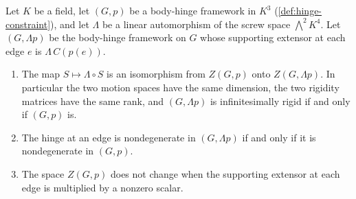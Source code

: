 \begin{theorem}
  \label{thm:projective-invariance}
  \leanok
  Let $K$ be a field, let $(G, p)$ be a body-hinge framework in $K^3$
  (\cref{def:hinge-constraint}), and let $\Lambda$ be a linear
  automorphism of the screw space $\bigwedge^2 K^4$. Let
  $(G, \Lambda p)$ be the body-hinge framework on $G$ whose supporting
  extensor at each edge $e$ is $\Lambda\, C(p(e))$.
  \begin{enumerate}
    \item The map $S \mapsto \Lambda \circ S$ is an isomorphism from
      $Z(G, p)$ onto $Z(G, \Lambda p)$. In particular the two motion
      spaces have the same dimension, the two rigidity matrices have the
      same rank, and $(G, \Lambda p)$ is infinitesimally rigid if and
      only if $(G, p)$ is.
    \item The hinge at an edge is nondegenerate in $(G, \Lambda p)$ if
      and only if it is nondegenerate in $(G, p)$.
    \item The space $Z(G, p)$ does not change when the supporting
      extensor at each edge is multiplied by a nonzero scalar.
  \end{enumerate}
\end{theorem}

